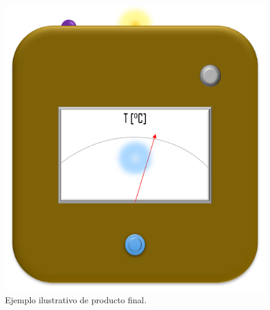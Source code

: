 \documentclass[letterpaper, 12 pt, conference]{ieeeconf}  %
\begin{document}
\begin{figure}[h!]
    \centering
    \includegraphics[scale=0.5]{proto.png}
    \caption{Ejemplo ilustrativo de producto final.}
\end{figure}
\pagebreak
\end{document}
